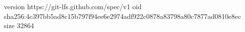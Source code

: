 version https://git-lfs.github.com/spec/v1
oid sha256:4c397bb5ad8c15b797f94ee6e2974adf922c0878a83798a80c7877ad0810e8ec
size 32864
